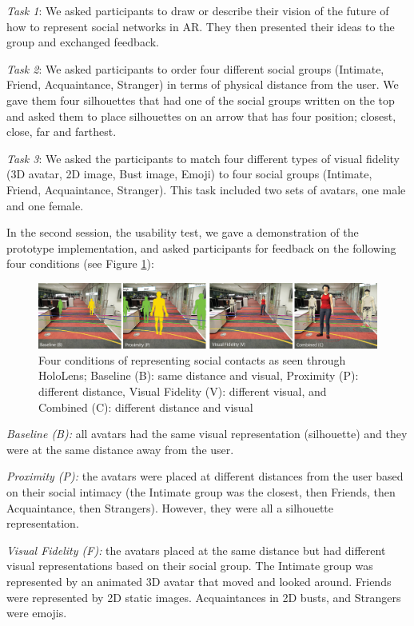 \textit{Task 1}: We asked participants to draw or describe their vision of the future of how to represent social networks in AR. They then presented their ideas to the group and exchanged feedback.


\textit{Task 2}: We asked participants to order four different social groups (Intimate, Friend, Acquaintance, Stranger) in terms of physical distance from the user. We gave them four silhouettes that had one of the social groups written on the top and asked them to place silhouettes on an arrow that has four position; closest, close, far and farthest.

\textit{Task 3}: We asked the participants to match four different types of visual fidelity (3D avatar, 2D image, Bust image, Emoji) to four social groups (Intimate, Friend, Acquaintance, Stranger). This task included two sets of avatars, one male and one female.

In the second session, the usability test, we gave a demonstration of the prototype implementation, and asked participants for feedback on the following four conditions (see Figure \ref{fig:contacts:conditions}): 

\begin{figure}
	\centering
	\includegraphics[width=\linewidth]{images/conditions-transparent-background}
	\caption{Four conditions of representing social contacts as seen through HoloLens; Baseline (B): same distance and visual, Proximity (P): different distance, Visual Fidelity (V): different visual, and Combined (C): different distance and visual}
	\label{fig:contacts:conditions}
\end{figure}


\textit{Baseline (B):} all avatars had the same visual representation (silhouette) and they were at the same distance away from the user.

\textit{Proximity (P):} the avatars were placed at different distances from the user based on their social intimacy (the Intimate group was the closest, then Friends, then Acquaintance, then Strangers). However, they were all a silhouette representation.

\textit{Visual Fidelity (F):} the avatars placed at the same distance but had different visual representations based on their social group. The Intimate group was represented by an animated 3D avatar that moved and looked around. Friends were represented by 2D static images. Acquaintances in 2D busts, and Strangers were emojis.

